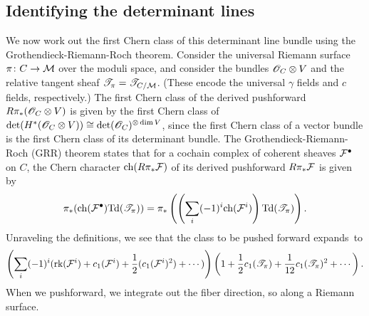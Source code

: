 
\subsection{Identifying the determinant lines}

We now work out the first Chern class of this determinant line bundle using the Grothendieck-Riemann-Roch theorem.
Consider the universal Riemann surface $\pi \colon C \to \mathcal M$ over the moduli space, 
and consider the bundles $\mathscr O_C \otimes V$ and the relative tangent sheaf $\mathscr T_\pi = \mathscr T_{C/\mathcal M}$.
(These encode the universal $\gamma$ fields and $c$ fields, respectively.)
The first Chern class of the derived pushforward $R\pi_*(\mathscr O_C \otimes V)$ is given by the first Chern class of $\det(H^*(\mathscr O_C \otimes V)) \cong \det(\mathscr O_C)^{\otimes \dim V}$, 
since the first Chern class of a vector bundle is the first Chern class of its determinant bundle.
The Grothendieck-Riemann-Roch (GRR) theorem states that for a cochain complex of coherent sheaves $\mathcal F^\bullet$ on $C$, 
the Chern character ${\rm ch}(R\pi_* \mathcal F)$ of its derived pushforward $R\pi_* \mathcal F$  is given by 
\def\Td{{\rm Td}}
\[
\pi_*( \ch(\cF^\bullet)\Td(\sT_\pi)) = \pi_*\left( \left(\sum_{i} (-1)^i \ch (\cF^i) \right) \Td(\sT_\pi)\right).
\]
Unraveling the definitions, we see that the class to be pushed forward expands~to
\[
\left(\sum_i (-1)^i ({\rm rk}(\mathcal F^i) + c_1(\mathcal F^i) + \frac{1}{2}(c_1(\mathcal F^i)^2) + \cdots)\right) \left(1 +\frac{1}{2}c_1(\mathscr T_\pi) + \frac{1}{12} c_1(\mathscr T_\pi)^2 + \cdots \right).
\]
When we pushforward, we integrate out the fiber direction, so along a Riemann surface.

